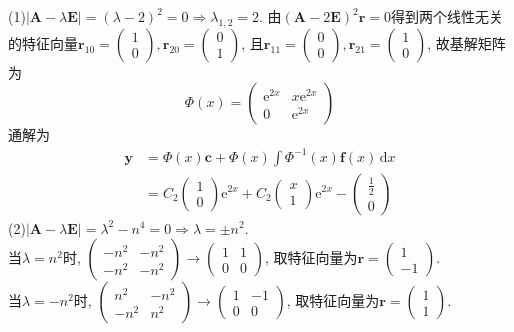 \documentclass[titlepage,11pt,a4paper,twoside]{report}
\makeatletter
\newcommand\diff{\,\mathrm{d}}
\newcommand\e{\mathrm{e}}
\newcommand\bmitPhi{\bm{\varPhi}}
\newenvironment{solve}{\par
	\pushQED{\qed}%
	\normalfont \topsep1\p@\@plus6\p@\relax
	\trivlist
	\item\relax
	{\hspace*{\parindent}{\heiti 解}\@addpunct{:}}\hspace\labelsep\ignorespaces
}{%
	\popQED\endtrivlist\@endpefalse
}
\makeatother
\begin{document}
\begin{solve}
(1)$|\bm{A}-\lambda\bm{E}|=(\lambda-2)^2=0\Rightarrow\lambda_{1,2}=2$. 由$(\bm{A}-2\bm{E})^2\bm{r}=0$得到两个线性无关的特征向量$\bm{r}_{10}=\begin{pmatrix}1\\0\end{pmatrix},\bm{r}_{20}=\begin{pmatrix}0\\1\end{pmatrix}$, 且$\bm{r}_{11}=\begin{pmatrix}0\\0\end{pmatrix},\bm{r}_{21}=\begin{pmatrix}1\\0\end{pmatrix}$, 故基解矩阵为
\[\bmitPhi(x)=\begin{pmatrix}\e^{2x}&x\e^{2x}\\0&\e^{2x}\end{pmatrix}\]
通解为\[\begin{split}\bm{y}
&=\bmitPhi(x)\bm{c}+\bmitPhi(x)\int\bmitPhi^{-1}(x)\bm{f}(x)\diff x\\
&=C_2\begin{pmatrix}1\\0\end{pmatrix}\e^{2x}+C_2\begin{pmatrix}x\\1\end{pmatrix}\e^{2x}-\begin{pmatrix}\frac{1}{2}\\0\end{pmatrix}
\end{split}\]
(2)$|\bm{A}-\lambda\bm{E}|=\lambda^2-n^4=0\Rightarrow\lambda=\pm n^2$.\\
当$\lambda=n^2$时, $\begin{pmatrix}-n^2&-n^2\\-n^2&-n^2\end{pmatrix}\to\begin{pmatrix}1&1\\0&0\end{pmatrix}$, 取特征向量为$\bm{r}=\begin{pmatrix}1\\-1\end{pmatrix}$.\\
当$\lambda=-n^2$时, $\begin{pmatrix}n^2&-n^2\\-n^2&n^2\end{pmatrix}\to\begin{pmatrix}1&-1\\0&0\end{pmatrix}$, 取特征向量为$\bm{r}=\begin{pmatrix}1\\1\end{pmatrix}$.\\

\end{solve}
\end{document}
